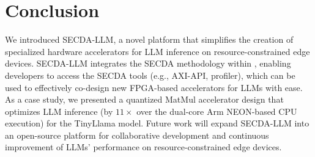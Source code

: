
\section{Conclusion}

We introduced SECDA-LLM, a novel platform that simplifies the creation of specialized hardware accelerators for LLM inference on resource-constrained edge devices. 
SECDA-LLM integrates the SECDA methodology within \LPP, enabling developers to access the SECDA tools (e.g., AXI-API, profiler), which can be used to effectively co-design new FPGA-based accelerators for LLMs with ease.
As a case study, we presented a quantized MatMul accelerator design that optimizes LLM inference (by $11\times$ over the dual-core Arm NEON-based CPU execution) for the TinyLlama model.
Future work will expand SECDA-LLM into an open-source platform for collaborative development and continuous improvement of LLMs' performance on resource-constrained edge devices.










